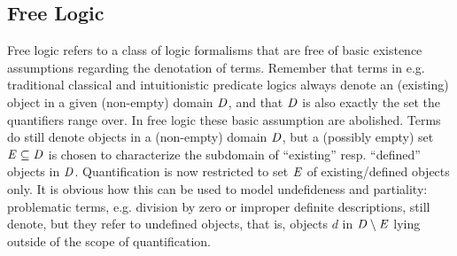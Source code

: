 \subsection{Free Logic}
Free logic \cite{Lambert60,Scott67,lambert02:_free_logic} refers to a class of logic
formalisms that are free of basic existence assumptions regarding the
denotation of terms. Remember that terms in e.g. traditional classical
and intuitionistic predicate logics always denote an (existing) object
in a given (non-empty) domain $\mathit{D}$, and that $\mathit{D}$ is also exactly the set the
quantifiers range over. In free logic these
basic assumption are abolished. Terms do still denote objects in a
(non-empty) domain $\mathit{D}$, but a (possibly empty) set $\mathit{E}\subseteq \mathit{D}$ is
chosen to characterize the subdomain of ``existing'' resp. ``defined''
objects in $\mathit{D}$. Quantification is
now restricted to set $\mathit{E}$ of existing/defined objects only. It is
obvious how this can be used to model undefideness and partiality:
problematic terms, e.g. division by zero or improper definite
descriptions, still denote, but they refer to undefined objects, that
is, objects $d$ in $\mathit{D}\setminus \mathit{E}$ lying outside of the scope of
quantification.  

